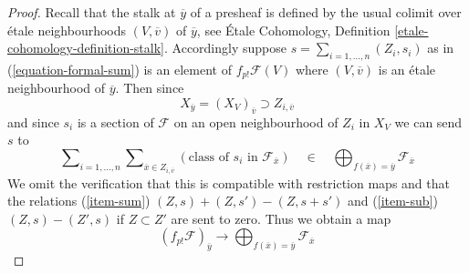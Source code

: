 \begin{proof}
Recall that the stalk at $\overline{y}$ of a presheaf is defined by the
usual colimit over \'etale neighbourhoods $(V, \overline{v})$
of $\overline{y}$, see \'Etale Cohomology, Definition
\ref{etale-cohomology-definition-stalk}. Accordingly
suppose $s = \sum_{i = 1, \ldots, n} (Z_i, s_i)$ as in
(\ref{equation-formal-sum}) is an element of $f_{p!}\mathcal{F}(V)$
where $(V, \overline{v})$ is an \'etale neighbourhood of $\overline{y}$.
Then since
$$
X_{\overline{y}} = (X_V)_{\overline{v}} \supset Z_{i, \overline{v}}
$$
and since $s_i$ is a section of $\mathcal{F}$ on an open neighbourhood
of $Z_i$ in $X_V$ we can send $s$ to
$$
\sum\nolimits_{i = 1, \ldots, n} 
\sum\nolimits_{\overline{x} \in Z_{i, \overline{v}}}
\left(\text{class of }s_i\text{ in }\mathcal{F}_{\overline{x}}\right)
\quad\in\quad
\bigoplus\nolimits_{f(\overline{x}) = \overline{y}} \mathcal{F}_{\overline{x}}
$$
We omit the verification that this is compatible with restriction
maps and that the relations (\ref{item-sum}) $(Z, s) + (Z, s') - (Z, s + s')$
and (\ref{item-sub}) $(Z, s) - (Z', s)$ if $Z \subset Z'$ are sent to zero.
Thus we obtain a map
$$
(f_{p!}\mathcal{F})_{\overline{y}}
\longrightarrow
\bigoplus\nolimits_{f(\overline{x}) = \overline{y}} \mathcal{F}_{\overline{x}}
$$


\end{proof}

